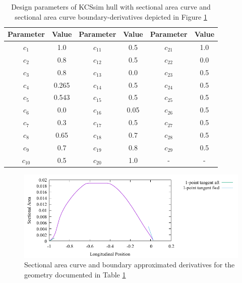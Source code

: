 \documentclass{report}
\begin{document}
\begin{table}[H]
    \centering
    \begin{tabular}{|c|c|c|c|c|c|}
        \hline 
        Parameter & Value & Parameter & Value & Parameter & Value\\
        \hline 
        $c_1$ & 1.0 & $c_{11}$ & 0.5 & $c_{21}$ & 1.0 \\
        \hline 
        $c_2$ & 0.8 & $c_{12}$ & 0.5 & $c_{22}$ & 0.0\\
        \hline 
        $c_3$ & 0.8 & $c_{13}$ & {\color{blue} 0.0} & $c_{23}$ & 0.5 \\
        \hline 
        $c_4$ & 0.265 & $c_{14}$ & 0.5 & $c_{24}$ & 0.5 \\
        \hline 
        $c_5$ & 0.543 & $c_{15}$ & 0.5 & $c_{25}$ & 0.5 \\
        \hline 
        $c_6$ & 0.0 & $c_{16}$ & 0.05 & $c_{26}$ & 0.5 \\
        \hline 
        $c_7$ & 0.3 & $c_{17}$ & 0.5 & $c_{27}$ & 0.5 \\
        \hline 
        $c_8$ & 0.65 & $c_{18}$ & 0.7 & $c_{28}$ & 0.5 \\
        \hline 
        $c_9$ & 0.7 & $c_{19}$ & 0.8 & $c_{29}$ & 0.5 \\
        \hline 
        $c_{10}$ & 0.5 & $c_{20}$ & 1.0 & - & - \\
        \hline 
    \end{tabular}
    \caption{Design parameters of KCSsim hull with sectional area curve and 
    sectional area curve boundary-derivatives depicted in Figure
    \ref{fig:test-4-sac-6}}
    \label{tab:test-4-6}
\end{table}
\begin{figure}[H]
    \centering
    \includegraphics[width = 0.7\linewidth]{figures/test-4-sac-6.pdf}
    \caption{Sectional area curve and boundary approximated derivatives for
    the geometry documented in Table \ref{tab:test-4-6}}
    \label{fig:test-4-sac-6}
\end{figure}
\end{document}
